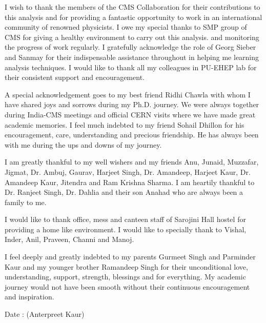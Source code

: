 {I wish to thank the members of the CMS Collaboration for their contributions to this analysis and for providing a fantastic opportunity to work in an international community of renowned physicists. I owe my special thanks to SMP group of CMS for giving a healthy environment to carry out this analysis. and monitoring the progress of work regularly. I gratefully acknowledge the role of Georg Sieber and Sanmay for their indispensable assistance throughout in helping me learning analysis techniques. I would like to thank all my colleagues in PU-EHEP lab for their consistent support and encouragement.

A special acknowledgement goes to my best friend Ridhi Chawla with whom I have shared joys and sorrows during my Ph.D. journey. We were always together during India-CMS meetings and official CERN visits where we have made great academic memories. I feel much indebted to my friend Sohail Dhillon for his encouragement, care, understanding and precious friendship. He has always been with me during the ups and downs of my journey. 

I am greatly thankful to my well wishers and my friends Anu, Junaid, Muzzafar, Jigmat, Dr. Ambuj, Gaurav, Harjeet Singh, Dr. Amandeep, Harjeet Kaur, Dr. Amandeep Kaur, Jitendra and Ram Krishna Sharma. I am heartily thankful to Dr. Ranjeet Singh, Dr. Dahlia and their son Anahad who are always been a family to me. 

I would like to thank office, mess and canteen staff of Sarojini Hall hostel for providing a home like environment. I would like to specially thank to Vishal, Inder, Anil, Praveen, Channi and Manoj.

I feel deeply and greatly indebted to my parents Gurmeet Singh and Parminder Kaur and my younger brother Ramandeep Singh for their unconditional love, understanding, support, strength, blessings and for everything. My academic journey would not have been smooth without their continuous encouragement and inspiration.\\[2cm]}
Date :  \hfill (Anterpreet Kaur)

